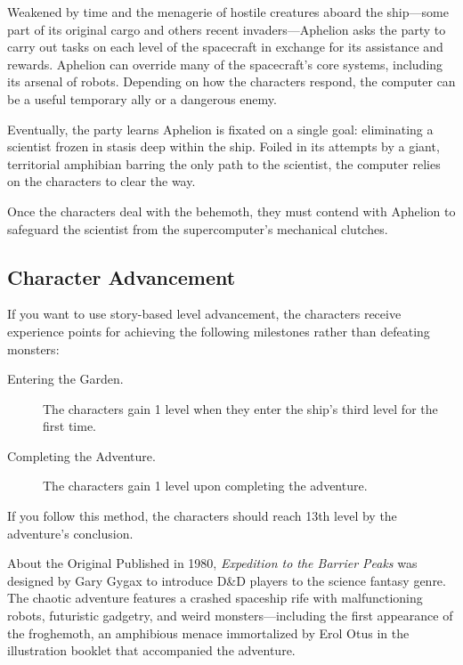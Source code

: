 \documentclass[10pt,a4paper,twoside,bg=print,twocolumn,openany,nodeprecatedcode]{dndbook}
\begin{document}
Weakened by time and the menagerie of hostile creatures aboard the ship—some part of its original cargo and others recent invaders—Aphelion asks the party to carry out tasks on each level of the spacecraft in exchange for its assistance and rewards. Aphelion can override many of the spacecraft's core systems, including its arsenal of robots. Depending on how the characters respond, the computer can be a useful temporary ally or a dangerous enemy.

Eventually, the party learns Aphelion is fixated on a single goal: eliminating a scientist frozen in stasis deep within the ship. Foiled in its attempts by a giant, territorial amphibian barring the only path to the scientist, the computer relies on the characters to clear the way.

Once the characters deal with the behemoth, they must contend with Aphelion to safeguard the scientist from the supercomputer's mechanical clutches.

\subsection{Character Advancement}
If you want to use story-based level advancement, the characters receive experience points for achieving the following milestones rather than defeating monsters:


\begin{description}
\item[Entering the Garden.]
The characters gain 1 level when they enter the ship's third level for the first time.
\item[Completing the Adventure.]
The characters gain 1 level upon completing the adventure.
\end{description}

If you follow this method, the characters should reach 13th level by the adventure's conclusion.

\begin{DndReadAloud}{About the Original}
Published in 1980, \textit{Expedition to the Barrier Peaks} was designed by Gary Gygax to introduce D\&D players to the science fantasy genre. The chaotic adventure features a crashed spaceship rife with malfunctioning robots, futuristic gadgetry, and weird monsters—including the first appearance of the froghemoth, an amphibious menace immortalized by Erol Otus in the illustration booklet that accompanied the adventure.

\end{DndReadAloud}
\end{document}
